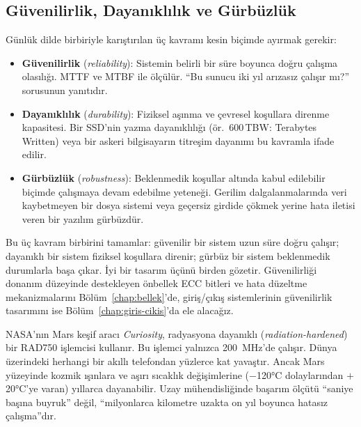 \subsection{Güvenilirlik, Dayanıklılık ve Gürbüzlük}
\label{subsec:guvenilirlik-dayaniklilik-gurbuzluk}

Günlük dilde birbiriyle karıştırılan üç kavramı kesin biçimde ayırmak gerekir:
\begin{itemize}
    \item \textbf{Güvenilirlik} (\emph{reliability}): Sistemin belirli bir süre boyunca doğru çalışma olasılığı. MTTF ve MTBF ile ölçülür. ``Bu sunucu iki yıl arızasız çalışır mı?'' sorusunun yanıtıdır.
    \item \textbf{Dayanıklılık} (\emph{durability}): Fiziksel aşınma ve çevresel koşullara direnme kapasitesi. Bir SSD'nin yazma dayanıklılığı (ör.\ 600\,TBW: Terabytes Written) veya bir askeri bilgisayarın titreşim dayanımı bu kavramla ifade edilir.
    \item \textbf{Gürbüzlük} (\emph{robustness}): Beklenmedik koşullar altında kabul edilebilir biçimde çalışmaya devam edebilme yeteneği. Gerilim dalgalanmalarında veri kaybetmeyen bir dosya sistemi veya geçersiz girdide çökmek yerine hata iletisi veren bir yazılım gürbüzdür.
\end{itemize}

Bu üç kavram birbirini tamamlar: güvenilir bir sistem uzun süre doğru çalışır; dayanıklı bir sistem fiziksel koşullara direnir; gürbüz bir sistem beklenmedik durumlarla başa çıkar. İyi bir tasarım üçünü birden gözetir. Güvenilirliği donanım düzeyinde destekleyen önbellek ECC bitleri ve hata düzeltme mekanizmalarını Bölüm~\ref{chap:bellek}'de, giriş/çıkış sistemlerinin güvenilirlik tasarımını ise Bölüm~\ref{chap:giris-cikis}'da ele alacağız.

\begin{bilginot}
NASA'nın Mars keşif aracı \emph{Curiosity}, radyasyona dayanıklı (\emph{radiation-hardened}) bir RAD750 işlemcisi kullanır. Bu işlemci yalnızca 200~MHz'de çalışır. Dünya üzerindeki herhangi bir akıllı telefondan yüzlerce kat yavaştır. Ancak Mars yüzeyinde kozmik ışınlara ve aşırı sıcaklık değişimlerine ($-$120°C dolaylarından $+$20°C'ye varan) yıllarca dayanabilir. Uzay mühendisliğinde başarım ölçütü ``saniye başına buyruk'' değil, ``milyonlarca kilometre uzakta on yıl boyunca hatasız çalışma''dır.
\end{bilginot}


